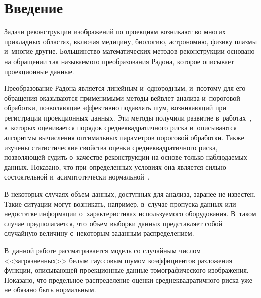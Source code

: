  
 
\vspace*{-6pt}



\thispagestyle{headings}

\begin{multicols}{2}

\label{st\stat}


\section{Введение}

Задачи реконструкции изображений по проекциям возникают во многих 
прикладных областях, включая медицину, биологию, астрономию, 
физику плазмы и~многие другие. Большинство математических методов 
реконструкции основано на обращении так называемого преобразования 
Радона, которое описывает проекционные данные.

 Преобразование 
Радона является линейным и~однородным, и~поэтому для его обращения 
оказываются применимыми методы вейв\-лет-ана\-ли\-за и~пороговой обработки, 
позволяющие эффективно подавлять шум, возникающий при регистрации проекционных 
данных. Эти методы получили развитие в~работах~\cite{D94, Kol94, Lee97}, 
в~которых оценивается порядок среднеквадратичного риска и~описываются 
алгоритмы вычисления оптимальных параметров пороговой обработки. 
%
Также изучены статистические свойства оценки среднеквадратичного риска,
 позволяющей судить о~качестве реконструкции на основе только наблюдаемых 
 данных. Показано, что при определенных условиях она является сильно 
 состоятельной и~асимптотически нормальной~\cite{SH16-1}.

В некоторых случаях объем данных, доступных для анализа, заранее 
не известен. Такие ситуации могут возникать, например, в~случае пропуска 
данных или недостатке информации о~характеристиках используемого оборудования. 
В~таком случае предполагается, что объем выборки данных представляет собой 
случайную величину с~некоторым заданным распределением.

 В~данной работе рассматривается модель со случайным числом <<загрязненных>> 
 белым гауссовым шумом коэффициентов разложения функции, описывающей 
 проекционные данные томографического изображения. Показано, что 
 предельное распределение оценки среднеквадратичного риска уже не 
 обязано быть нормальным.
 

\end{multicols}

